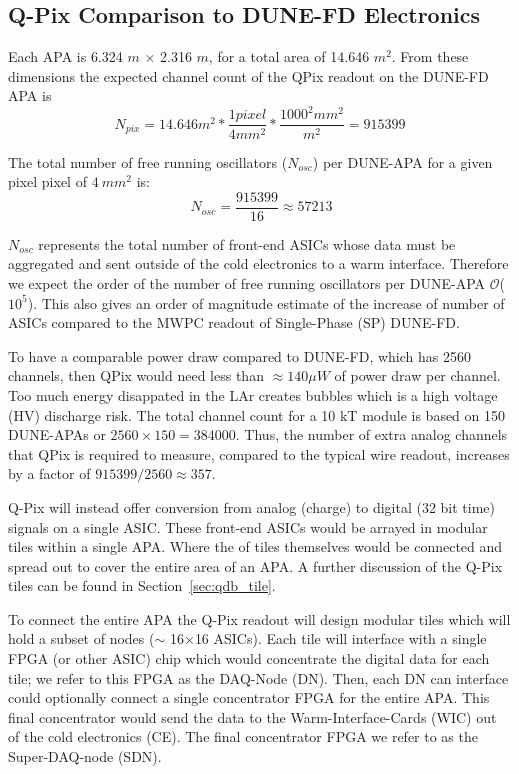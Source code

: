\subsection{Q-Pix Comparison to DUNE-FD Electronics}

Each APA is 6.324 $\unit{m}$ $\times$ 2.316 $\unit{m}$, for a total area of 14.646 $\unit{m^{2}}$.
From these dimensions the expected channel count of the QPix readout on the DUNE-FD APA is
\begin{equation}
  N_{pix} = 14.646 m^{2} * \frac{1 pixel}{4 mm^{2}} * \frac{ 1000^{2} mm^{2} }{m^{2}} = 915399
\end{equation}

The total number of free running oscillators ($N_{osc}$) per DUNE-APA for a given pixel pixel of $4~mm^{2}$ is:
\begin{equation}~\label{eq:nosc}
N_{osc} = \frac{915399}{16} \approx 57213
\end{equation}

$N_{osc}$ represents the total number of front-end ASICs whose data must be aggregated and sent outside of the cold electronics to a warm interface.
Therefore we expect the order of the number of free running oscillators per DUNE-APA $\mathcal{O}$($10^5$).
This also gives an order of magnitude estimate of the increase of number of ASICs compared to the MWPC readout of Single-Phase (SP) DUNE-FD.

To have a comparable power draw compared to DUNE-FD, which has 2560 channels, then QPix would need less than $\approx 140 \mu W$ of power draw per channel.
Too much energy disappated in the LAr creates bubbles which is a high voltage (HV) discharge risk.
The total channel count for a 10 kT module is based on 150 DUNE-APAs or $2560\times 150 = 384000$.
Thus, the number of extra analog channels that QPix is required to measure, compared to the typical wire readout, increases by a factor of $915399 / 2560 \approx 357$.

Q-Pix will instead offer conversion from analog (charge) to digital (32 bit time) signals on a single ASIC.
These front-end ASICs would be arrayed in modular tiles within a single APA.
Where the of tiles themselves would be connected and spread out to cover the entire area of an APA.
A further discussion of the Q-Pix tiles can be found in Section~\ref{sec:qdb_tile}.

To connect the entire APA the Q-Pix readout will design modular tiles which will hold a subset of nodes ($\sim$ 16$\times$16 ASICs).
Each tile will interface with a single FPGA (or other ASIC) chip which would concentrate the digital data for each tile; we refer to this FPGA as the DAQ-Node (DN).
Then, each DN can interface could optionally connect a single concentrator FPGA for the entire APA.
This final concentrator would send the data to the Warm-Interface-Cards (WIC) out of the cold electronics (CE).
The final concentrator FPGA we refer to as the Super-DAQ-node (SDN).

